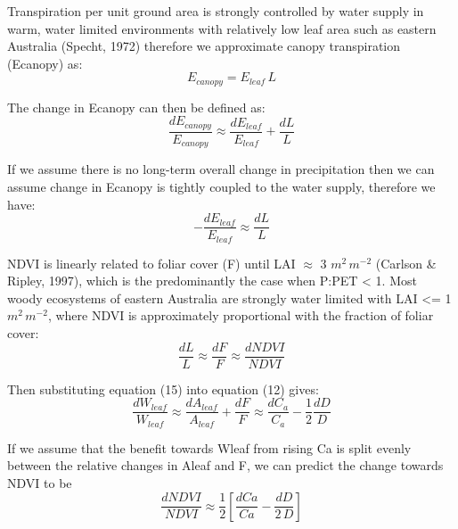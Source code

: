 \documentclass[gc, manuscript]{copernicus}
\begin{document}
Transpiration per unit ground area is strongly controlled by water
supply in warm, water limited environments with relatively low leaf area
such as eastern Australia (Specht, 1972) therefore we approximate canopy
transpiration (Ecanopy) as: \begin{equation}
E_{canopy}=E_{leaf}\,L
\end{equation}

The change in Ecanopy can then be defined as: \begin{equation}
\frac{dE_{canopy}}{E_{canopy}} \approx \frac{dE_{leaf}}{E_{leaf}}+\frac{dL}{L}
\end{equation}

If we assume there is no long-term overall change in precipitation then
we can assume change in Ecanopy is tightly coupled to the water supply,
therefore we have: \begin{equation}
-\frac{dE_{leaf}}{E_{leaf}} \approx \frac{dL}{L}
\end{equation}

NDVI is linearly related to foliar cover (F) until LAI \(\approx\) 3
\(m^2\,m^{-2}\) (Carlson \& Ripley, 1997), which is the predominantly
the case when P:PET \textless{} 1. Most woody ecosystems of eastern
Australia are strongly water limited with LAI \textless= 1
\(m^2\,m^{-2}\), where NDVI is approximately proportional with the
fraction of foliar cover: \begin{equation}
\frac{dL}{L}\approx\frac{dF}{F}\approx\frac{d NDVI}{NDVI}
\end{equation}

Then substituting equation (15) into equation (12) gives:
\begin{equation}
\frac{dW_{leaf}}{W_{leaf}} \approx  \frac{dA_{leaf}}{A_{leaf}} + \frac{dF}{F} \approx \frac{dC_a}{C_a} - \frac{1}{2}\frac{dD}{D}
\end{equation}

If we assume that the benefit towards Wleaf from rising Ca is split
evenly between the relative changes in Aleaf and F, we can predict the
change towards NDVI to be \begin{equation}
\frac{dNDVI}{NDVI} \approx \frac{1}{2}[\frac{dCa}{Ca}-\frac{dD}{2\,D}]
\end{equation}
\end{document}
